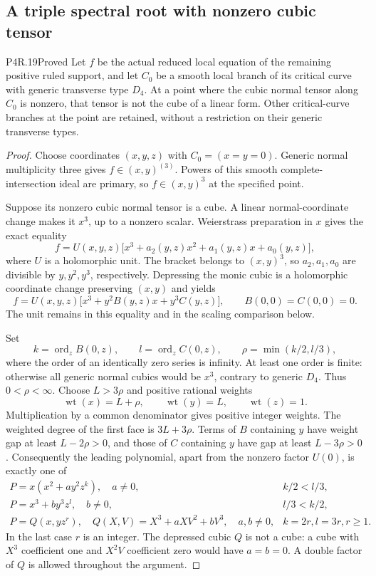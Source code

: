 \subsection{A triple spectral root with nonzero cubic tensor}

\begin{statement}{P4R.19}{Proved}
Let $f$ be the actual reduced local equation of the remaining
positive ruled support, and let $C_0$ be a smooth local branch
of its critical curve with generic transverse type $D_4$.
At a point where the cubic normal tensor along $C_0$ is
nonzero, that tensor is not the cube of a linear form.
Other critical-curve branches at the point are retained,
without a restriction on their generic transverse types.
\end{statement}
\begin{proof}
Choose coordinates $(x,y,z)$ with $C_0=(x=y=0)$.
Generic normal multiplicity three gives
$f\in(x,y)^{(3)}$. Powers of this smooth
complete-intersection ideal are primary, so
$f\in(x,y)^3$ at the specified point.

Suppose its nonzero cubic normal tensor is a cube.
A linear normal-coordinate change makes it $x^3$, up
to a nonzero scalar. Weierstrass preparation in $x$
gives the exact equality
\[
 f=U(x,y,z)\bigl[x^3+a_2(y,z)x^2+a_1(y,z)x+a_0(y,z)\bigr],
\]
where $U$ is a holomorphic unit. The bracket belongs to
$(x,y)^3$, so $a_2,a_1,a_0$ are divisible by $y,y^2,y^3$,
respectively. Depressing the monic cubic is a holomorphic
coordinate change preserving $(x,y)$ and yields
\[
 f=U(x,y,z)\bigl[x^3+y^2B(y,z)x+y^3C(y,z)\bigr],
 \qquad B(0,0)=C(0,0)=0.                         \tag{R19.1}
\]
The unit remains in this equality and in the scaling
comparison below.

Set
\[
 k=\operatorname{ord}_z B(0,z),\qquad
 l=\operatorname{ord}_z C(0,z),\qquad
 \rho=\min(k/2,l/3),
\]
where the order of an identically zero series is infinity.
At least one order is finite: otherwise all generic normal
cubics would be $x^3$, contrary to generic $D_4$.
Thus $0<\rho<\infty$. Choose $L>3\rho$ and positive
rational weights
\[
       \operatorname{wt}(x)=L+\rho,\qquad
       \operatorname{wt}(y)=L,\qquad
       \operatorname{wt}(z)=1.
\]
Multiplication by a common denominator gives positive
integer weights. The weighted degree of the first face
is $3L+3\rho$. Terms of $B$ containing $y$ have weight
gap at least $L-2\rho>0$, and those of $C$ containing
$y$ have gap at least $L-3\rho>0$. Consequently the
leading polynomial, apart from the nonzero factor $U(0)$,
is exactly one of
\[
\begin{array}{ll}
 P=x(x^2+a y^2z^k),\quad a\ne0,
       & k/2<l/3,\\[2pt]
 P=x^3+b y^3z^l,\quad b\ne0,
       & l/3<k/2,\\[2pt]
 P=Q(x,yz^r),\quad
 Q(X,V)=X^3+aXV^2+bV^3,\quad a,b\ne0,
       & k=2r, l=3r, r\ge1.
\end{array}                                                   \tag{R19.2}
\]
In the last case $r$ is an integer. The depressed cubic
$Q$ is not a cube: a cube with $X^3$ coefficient one and
$X^2V$ coefficient zero would have $a=b=0$. A double
factor of $Q$ is allowed throughout the argument.


\end{proof}
